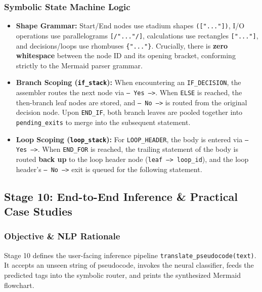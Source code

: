 \documentclass[11pt,a4paper]{article}
\begin{document}
\subsubsection{Symbolic State Machine Logic}
\begin{itemize}
    \item \textbf{Shape Grammar:} Start/End nodes use stadium shapes \texttt{(["..."])}, I/O operations use parallelograms \texttt{[/"..."/]}, calculations use rectangles \texttt{["..."]}, and decisions/loops use rhombuses \texttt{\{"..."\}}. Crucially, there is \textbf{zero whitespace} between the node ID and its opening bracket, conforming strictly to the Mermaid parser grammar.
    \item \textbf{Branch Scoping (\texttt{if\_stack}):} When encountering an \texttt{IF\_DECISION}, the assembler routes the next node via \texttt{-- Yes -->}. When \texttt{ELSE} is reached, the then-branch leaf nodes are stored, and \texttt{-- No -->} is routed from the original decision node. Upon \texttt{END\_IF}, both branch leaves are pooled together into \texttt{pending\_exits} to merge into the subsequent statement.
    \item \textbf{Loop Scoping (\texttt{loop\_stack}):} For \texttt{LOOP\_HEADER}, the body is entered via \texttt{-- Yes -->}. When \texttt{END\_FOR} is reached, the trailing statement of the body is routed \textbf{back up} to the loop header node (\texttt{leaf --> loop\_id}), and the loop header's \texttt{-- No -->} exit is queued for the following statement.
\end{itemize}

\subsection{Stage 10: End-to-End Inference \& Practical Case Studies}

\subsubsection{Objective \& NLP Rationale}
Stage 10 defines the user-facing inference pipeline \texttt{translate\_pseudocode(text)}. It accepts an unseen string of pseudocode, invokes the neural classifier, feeds the predicted tags into the symbolic router, and prints the synthesized Mermaid flowchart.
\end{document}
